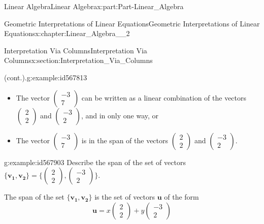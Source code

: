 \documentclass[oneside,10pt,]{book}
\numberwithin{equation}{section}
\begin{document}
\begin{partptx}{Linear Algebra}{}{Linear Algebra}{}{}{x:part:Part-Linear_Algebra}
\begin{chapterptx}{Geometric Interpretations of Linear Equations}{}{Geometric Interpretations of Linear Equations}{}{}{x:chapter:Linear_Algebra__2}
\begin{sectionptx}{Interpretation Via Columns}{}{Interpretation Via Columns}{}{}{x:section:Interpretation_Via_Columns}
\begin{example}{(cont.).}{g:example:id567813}
\begin{itemize}[label=\textbullet]
\item{}The vector \(\begin{pmatrix} -3 \\ 7 \end{pmatrix}\) can be written as a linear combination of the vectors \(\begin{pmatrix} 2 \\ 2 \end{pmatrix}\) and \(\begin{pmatrix} -3 \\ 2 \end{pmatrix}\), and in only one way, or%
\item{}The vector \(\begin{pmatrix} -3 \\ 7 \end{pmatrix}\) is in the span of the vectors \(\begin{pmatrix} 2 \\ 2 \end{pmatrix}\) and \(\begin{pmatrix} -3 \\ 2 \end{pmatrix}\).%
\end{itemize}
%
\end{example}
\begin{example}{}{g:example:id567903}%
Describe the span of the set of vectors \(\{\mathbf{v_1, v_2}\}=\Big\{\begin{pmatrix} 2 \\ 2 \end{pmatrix}, \begin{pmatrix} -3 \\ 2 \end{pmatrix} \Big\}\).%
\par\smallskip%
\noindent\hypertarget{g:solution:id567887}{}The span of the set \(\{\mathbf{v_1, v_2}\}\) is the set of vectors \(\mathbf{u}\) of the form%
\begin{equation*}
\mathbf{u}=x \begin{pmatrix} 2 \\ 2 \end{pmatrix}+y \begin{pmatrix} -3 \\ 2 \end{pmatrix}
\end{equation*}

\end{example}
\end{sectionptx}
\end{chapterptx}
\end{partptx}
\end{document}
